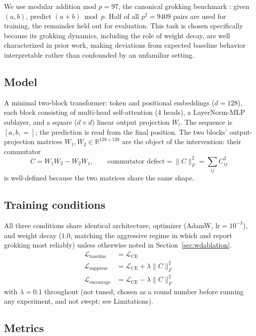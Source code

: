 \documentclass[11pt]{article}
\begin{document}
We use modular addition mod $p=97$, the canonical grokking benchmark
\citep{power2022grokking,nanda2023progress}: given $(a, b)$, predict
$(a+b) \bmod p$. Half of all $p^2 = 9409$ pairs are used for training, the
remainder held out for evaluation. This task is chosen specifically
because its grokking dynamics, including the role of weight decay, are
well characterized in prior work, making deviations from expected baseline
behavior interpretable rather than confounded by an unfamiliar setting.

\subsection{Model}

A minimal two-block transformer: token and positional embeddings ($d=128$),
each block consisting of multi-head self-attention (4 heads), a
LayerNorm-MLP sublayer, and a square ($d \times d$) linear output
projection $W_l$. The sequence is $[a, b, {=}]$; the prediction is read
from the final position. The two blocks' output-projection matrices
$W_1, W_2 \in \mathbb{R}^{128\times128}$ are the object of the
intervention: their commutator
\[
C = W_1 W_2 - W_2 W_1, \qquad \text{commutator defect} = \lVert C \rVert_F^2 = \sum_{ij} C_{ij}^2
\]
is well-defined because the two matrices share the same shape.

\subsection{Training conditions}

All three conditions share identical architecture, optimizer (AdamW,
lr$=10^{-3}$), and weight decay ($1.0$, matching the aggressive regime
in which \citet{power2022grokking} and \citet{thilak2022slingshot} report
grokking most reliably) unless otherwise noted in Section~\ref{sec:wdablation}.
\begin{align}
\mathcal{L}_{\text{baseline}} &= \mathcal{L}_{\text{CE}} \\
\mathcal{L}_{\text{suppress}} &= \mathcal{L}_{\text{CE}} + \lambda \lVert C \rVert_F^2 \\
\mathcal{L}_{\text{encourage}} &= \mathcal{L}_{\text{CE}} - \lambda \lVert C \rVert_F^2
\end{align}
with $\lambda = 0.1$ throughout (not tuned; chosen as a round number
before running any experiment, and not swept; see Limitations).

\subsection{Metrics}
\end{document}

